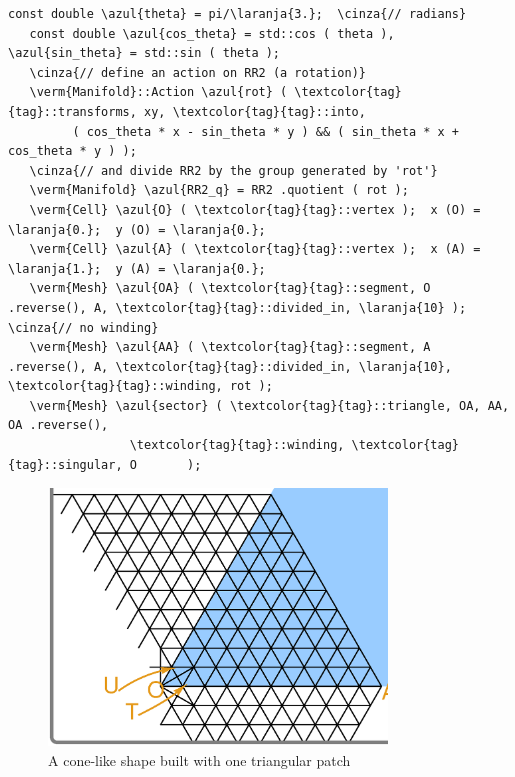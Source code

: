\begin{Verbatim}[commandchars=\\\{\},formatcom=\small\tt,frame=single,
   label=parag-\ref{\numb section 7.\numb parag 16}.cpp,rulecolor=\color{moldura},
   baselinestretch=0.94,framesep=2mm                                             ]
   const double \azul{theta} = pi/\laranja{3.};  \cinza{// radians}
   const double \azul{cos_theta} = std::cos ( theta ), \azul{sin_theta} = std::sin ( theta );
   \cinza{// define an action on RR2 (a rotation)}
   \verm{Manifold}::Action \azul{rot} ( \textcolor{tag}{tag}::transforms, xy, \textcolor{tag}{tag}::into,
         ( cos_theta * x - sin_theta * y ) && ( sin_theta * x + cos_theta * y ) );
   \cinza{// and divide RR2 by the group generated by 'rot'}
   \verm{Manifold} \azul{RR2_q} = RR2 .quotient ( rot );
   \verm{Cell} \azul{O} ( \textcolor{tag}{tag}::vertex );  x (O) = \laranja{0.};  y (O) = \laranja{0.};
   \verm{Cell} \azul{A} ( \textcolor{tag}{tag}::vertex );  x (A) = \laranja{1.};  y (A) = \laranja{0.};
   \verm{Mesh} \azul{OA} ( \textcolor{tag}{tag}::segment, O .reverse(), A, \textcolor{tag}{tag}::divided_in, \laranja{10} );  \cinza{// no winding}
   \verm{Mesh} \azul{AA} ( \textcolor{tag}{tag}::segment, A .reverse(), A, \textcolor{tag}{tag}::divided_in, \laranja{10}, \textcolor{tag}{tag}::winding, rot );
   \verm{Mesh} \azul{sector} ( \textcolor{tag}{tag}::triangle, OA, AA, OA .reverse(),
                 \textcolor{tag}{tag}::winding, \textcolor{tag}{tag}::singular, O       );
\end{Verbatim}

\begin{figure}[ht] \centering
  \includegraphics[width=90mm]{sector-cut.eps}
  \caption{A cone-like shape built with one triangular patch}
  \label{\numb section 7.\numb fig 12}
\end{figure}


